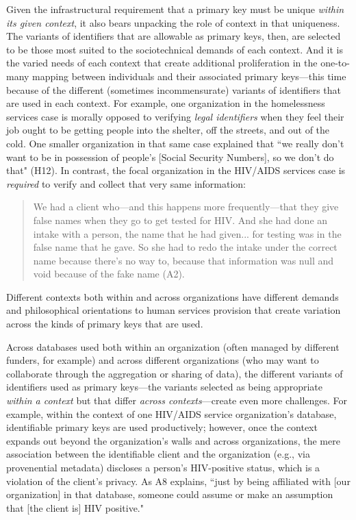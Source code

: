 Given the infrastructural requirement that a primary key must be unique \textit{within its given context}, it also bears unpacking the role of context in that uniqueness. The variants of identifiers that are allowable as primary keys, then, are selected to be those most suited to the sociotechnical demands of each context. And it is the varied needs of each context that create additional proliferation in the one-to-many mapping between individuals and their associated primary keys---this time because of the different (sometimes incommensurate) variants of identifiers that are used in each context. For example, one organization in the homelessness services case is morally opposed to verifying \textit{legal identifiers} when they feel their job ought to be getting people into the shelter, off the streets, and out of the cold. One smaller organization in that same case explained that ``we really don't want to be in possession of people's [Social Security Numbers], so we don't do that" (H12). In contrast, the focal organization in the HIV/AIDS services case is \textit{required} to verify and collect that very same information:

\begin{quote}\singlespacing
    We had a client who---and this happens more frequently---that they give false names when they go to get tested for HIV. And she had done an intake with a person, the name that he had given... for testing was in the false name that he gave. So she had to redo the intake under the correct name because there's no way to, because that information was null and void because of the fake name (A2).
\end{quote}

Different contexts both within and across organizations have different demands and philosophical orientations to human services provision that create variation across the kinds of primary keys that are used. 

Across databases used both within an organization (often managed by different funders, for example) and across different organizations (who may want to collaborate through the aggregation or sharing of data), the different variants of identifiers used as primary keys---the variants selected as being appropriate \textit{within a context} but that differ \textit{across contexts}---create even more challenges. For example, within the context of one HIV/AIDS service organization's database, identifiable primary keys are used productively; however, once the context expands out beyond the organization's walls and across organizations, the mere association between the identifiable client and the organization (e.g., via provenential metadata) discloses a person's HIV-positive status, which is a violation of the client's privacy. As A8 explains, ``just by being affiliated with [our organization] in that database, someone could assume or make an assumption that [the client is] HIV positive."

